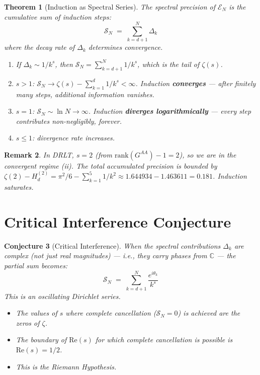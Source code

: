 \documentclass[11pt]{article}
\newtheorem{theorem}{Theorem}
\newtheorem{conjecture}[theorem]{Conjecture}
\newtheorem{remark}[theorem]{Remark}
\begin{document}
\begin{theorem}[Induction as Spectral Series]\label{thm:series}
The spectral precision of $\mathcal{E}_N$ is the cumulative sum
of induction steps:
\[
  \mathcal{S}_N \;=\; \sum_{k=d+1}^{N} \Delta_k
\]
where the decay rate of $\Delta_k$ determines convergence.

\begin{enumerate}
  \item[(i)] If $\Delta_k \sim 1/k^s$, then
    $\mathcal{S}_N = \sum_{k=d+1}^{N} 1/k^s$,
    which is the tail of $\zeta(s)$.

  \item[(ii)] $s > 1$: $\mathcal{S}_N \to
    \zeta(s) - \sum_{k=1}^{d} 1/k^s < \infty$.
    Induction \textbf{converges} --- after finitely many steps,
    additional information vanishes.

  \item[(iii)] $s = 1$: $\mathcal{S}_N \sim \ln N \to \infty$.
    Induction \textbf{diverges logarithmically} ---
    every step contributes non-negligibly, forever.

  \item[(iv)] $s \leq 1$: divergence rate increases.
\end{enumerate}
\end{theorem}

\begin{remark}
In DRLT, $s = 2$ (from $\mathrm{rank}(G^{AA}) - 1 = 2$),
so we are in the convergent regime (ii).
The total accumulated precision is bounded by
$\zeta(2) - H_d^{(2)} = \pi^2/6 - \sum_{k=1}^{5} 1/k^2
\approx 1.644934 - 1.463611 = 0.181$.
\emph{Induction saturates.}
\end{remark}

\section{Critical Interference Conjecture}

\begin{conjecture}[Critical Interference]\label{conj:interference}
When the spectral contributions $\Delta_k$ are complex
(not just real magnitudes) --- i.e., they carry phases from
$\mathbb{C}$ --- the partial sum becomes:
\[
  \mathcal{S}_N \;=\; \sum_{k=d+1}^{N} \frac{e^{i\theta_k}}{k^s}
\]
This is an oscillating Dirichlet series.

\begin{itemize}
  \item The values of $s$ where complete cancellation
    ($\mathcal{S}_N = 0$) is achieved are the zeros of $\zeta$.
  \item The boundary of $\mathrm{Re}(s)$ for which
    complete cancellation is possible is $\mathrm{Re}(s) = 1/2$.
  \item This is the Riemann Hypothesis.
\end{itemize}
\end{conjecture}
\end{document}
